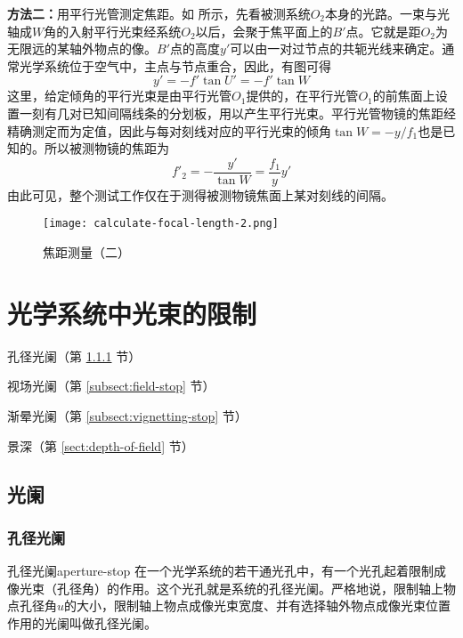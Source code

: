 \documentclass[cn,10pt,chinesefont=founder,math=mtpro2,cite=super,toc=onecol,twoside,openany]{elegantbook}
\begin{document}
\textbf{方法二：}用平行光管测定焦距。如 所示，先看被测系统$O_2$本身的光路。一束与光轴成$W$角的入射平行光束经系统$O_2$以后，会聚于焦平面上的$B'$点。它就是距$O_2$为无限远的某轴外物点的像。$B'$点的高度$y'$可以由一对过节点的共轭光线来确定。通常光学系统位于空气中，主点与节点重合，因此，有图可得
\begin{equation}
y'=-f'\tan U'=-f'\tan W
\end{equation}
这里，给定倾角的平行光束是由平行光管$O_1$提供的，在平行光管$O_1$的前焦面上设置一刻有几对已知间隔线条的分划板，用以产生平行光束。平行光管物镜的焦距经精确测定而为定值，因此与每对刻线对应的平行光束的倾角$\tan W=-y/f_1$也是已知的。所以被测物镜的焦距为
\begin{equation}
f'_2=-\frac{y'}{\tan W}=\frac{f_1}{y}y'
\end{equation}
由此可见，整个测试工作仅在于测得被测物镜焦面上某对刻线的间隔。

\begin{figure}[htbp]
	\centering
	\texttt{[image: calculate-focal-length-2.png]}
	\caption{焦距测量（二）}
	\label{fig:calculate-focal-length-2}
\end{figure}

\chapter{光学系统中光束的限制}

\begin{introduction}
	\item 孔径光阑（第 \ref{subsect:aperture-stop} 节）
	\item 视场光阑（第 \ref{subsect:field-stop} 节）
	\item 渐晕光阑（第 \ref{subsect:vignetting-stop} 节）
	\item 景深（第 \ref{sect:depth-of-field} 节）
\end{introduction}

\section{光阑}
\subsection{孔径光阑}
\label{subsect:aperture-stop}
\begin{definition}{孔径光阑}{aperture-stop}
在一个光学系统的若干通光孔中，有一个光孔起着限制成像光束（孔径角）的作用。这个光孔就是系统的孔径光阑。严格地说，限制轴上物点孔径角$u$的大小，限制轴上物点成像光束宽度、并有选择轴外物点成像光束位置作用的光阑叫做孔径光阑。
\end{definition}
\end{document}
